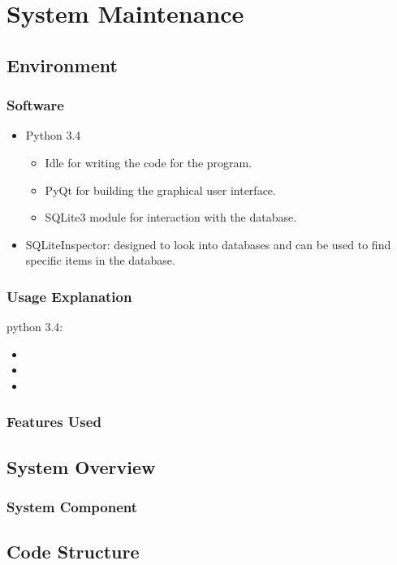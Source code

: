 \chapter{System Maintenance}


\section{Environment}

\subsection{Software}
\begin{itemize}
\item Python 3.4
\begin{itemize}
\item Idle for writing the code for the program.
\item PyQt for building the graphical user interface.
\item SQLite3 module for interaction with the database.
\end{itemize}
\item SQLiteInspector: designed to look into databases and can be used to find specific items in the database.
\end{itemize}
\subsection{Usage Explanation}
python 3.4:
\begin{itemize}
	\item 
	\item 
	\item 
\end{itemize}
\subsection{Features Used}

\section{System Overview}

\subsection{System Component}

\section{Code Structure}

